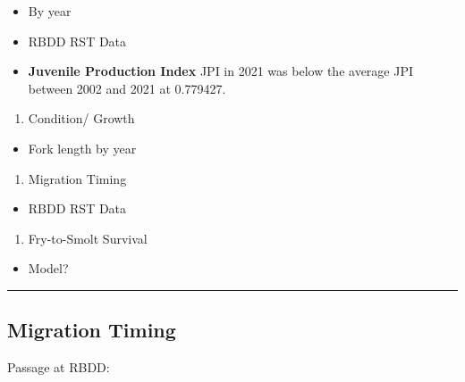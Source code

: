 \documentclass[
]{book}
\providecommand{\tightlist}{%
  \setlength{\itemsep}{0pt}\setlength{\parskip}{0pt}}
\theoremstyle{definition}
\theoremstyle{definition}
\theoremstyle{definition}
\theoremstyle{definition}
\theoremstyle{remark}
\begin{document}
\begin{itemize}
\item
  By year
\item
  RBDD RST Data
\item
  \textbf{Juvenile Production Index} JPI in 2021 was below the average JPI between 2002 and 2021 at 0.779427.
\end{itemize}

\begin{enumerate}
\def\labelenumi{\arabic{enumi}.}
\setcounter{enumi}{1}
\tightlist
\item
  Condition/ Growth
\end{enumerate}

\begin{itemize}
\tightlist
\item
  Fork length by year
\end{itemize}

\begin{enumerate}
\def\labelenumi{\arabic{enumi}.}
\setcounter{enumi}{2}
\tightlist
\item
  Migration Timing
\end{enumerate}

\begin{itemize}
\tightlist
\item
  RBDD RST Data
\end{itemize}

\begin{enumerate}
\def\labelenumi{\arabic{enumi}.}
\setcounter{enumi}{3}
\tightlist
\item
  Fry-to-Smolt Survival
\end{enumerate}

\begin{itemize}
\tightlist
\item
  Model?
\end{itemize}

\begin{center}\rule{0.5\linewidth}{0.5pt}\end{center}

\hypertarget{migration-timing}{%
\subsection{Migration Timing}\label{migration-timing}}

Passage at RBDD:
\end{document}
